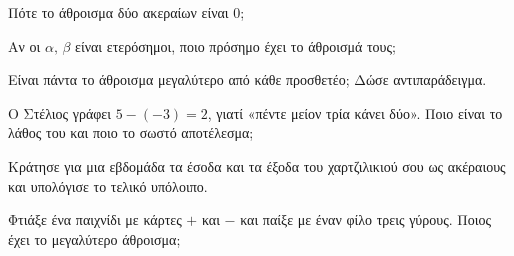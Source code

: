 
\ex Πότε το άθροισμα δύο ακεραίων είναι $0$;

\ex Αν οι $\alpha,\,\beta$ είναι ετερόσημοι, ποιο πρόσημο έχει το άθροισμά τους;

\ex Είναι πάντα το άθροισμα μεγαλύτερο από κάθε προσθετέο; Δώσε αντιπαράδειγμα.

\ex Ο Στέλιος γράφει $5-(-3)=2$, γιατί «πέντε μείον τρία κάνει δύο». Ποιο είναι το λάθος του και ποιο το σωστό αποτέλεσμα;


\ex Κράτησε για μια εβδομάδα τα έσοδα και τα έξοδα του χαρτζιλικιού σου ως ακέραιους και υπολόγισε το τελικό υπόλοιπο.

\ex Φτιάξε ένα παιχνίδι με κάρτες $+$ και $-$ και παίξε με έναν φίλο τρεις γύρους. Ποιος έχει το μεγαλύτερο άθροισμα;
